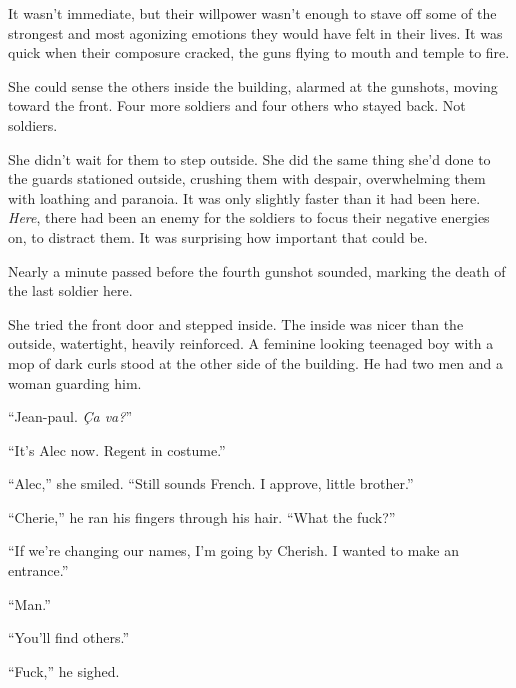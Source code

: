 It wasn't immediate, but their willpower wasn't enough to stave off some of the strongest and most agonizing emotions they would have felt in their lives.  It was quick when their composure cracked, the guns flying to mouth and temple to fire.



She could sense the others inside the building, alarmed at the gunshots, moving toward the front.  Four more soldiers and four others who stayed back.  Not soldiers.



She didn't wait for them to step outside.  She did the same thing she'd done to the guards stationed outside, crushing them with despair, overwhelming them with loathing and paranoia.  It was only slightly faster than it had been here.  \emph{Here}, there had been an enemy for the soldiers to focus their negative energies on, to distract them.  It was surprising how important that could be.



Nearly a minute passed before the fourth gunshot sounded, marking the death of the last soldier here.



She tried the front door and stepped inside.  The inside was nicer than the outside, watertight, heavily reinforced.  A feminine looking teenaged boy with a mop of dark curls stood at the other side of the building.  He had two men and a woman guarding him.



``Jean-paul.  \emph{\c{C}a va?}''



``It's Alec now.  Regent in costume.''



``Alec,'' she smiled.  ``Still sounds French.  I approve, little brother.''



``Cherie,'' he ran his fingers through his hair. ``What the fuck?''



``If we're changing our names, I'm going by Cherish.  I wanted to make an entrance.''



``Man.''



``You'll find others.''



``Fuck,'' he sighed.



